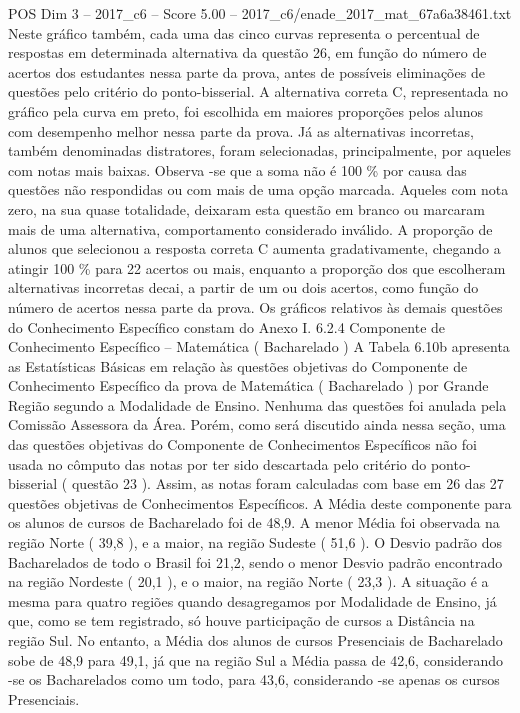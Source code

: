 \begin{textsample}{POS Dim 3 – 2017\_c6 – Score 5.00 – 2017\_c6/enade\_2017\_mat\_67a6a38461.txt}
Neste gráfico também, cada uma das cinco curvas representa o percentual de respostas em determinada alternativa da questão 26, em função do número de acertos dos estudantes nessa parte da prova, antes de possíveis eliminações de questões pelo critério do ponto-bisserial.
A alternativa correta C, representada no gráfico pela curva em preto, foi escolhida em maiores proporções pelos alunos com desempenho melhor nessa parte da prova.
Já as alternativas incorretas, também denominadas distratores, foram selecionadas, principalmente, por aqueles com notas mais baixas.
Observa -se que a soma não é 100 \% por causa das questões não respondidas ou com mais de uma opção marcada.
Aqueles com nota zero, na sua quase totalidade, deixaram esta questão em branco ou marcaram mais de uma alternativa, comportamento considerado inválido.
A proporção de alunos que selecionou a resposta correta C aumenta gradativamente, chegando a atingir 100 \% para 22 acertos ou mais, enquanto a proporção dos que escolheram alternativas incorretas decai, a partir de um ou dois acertos, como função do número de acertos nessa parte da prova.
Os gráficos relativos às demais questões do Conhecimento Específico constam do Anexo I. 6.2.4 Componente de Conhecimento Específico – Matemática ( Bacharelado ) A Tabela 6.10b apresenta as Estatísticas Básicas em relação às questões objetivas do Componente de Conhecimento Específico da prova de Matemática ( Bacharelado ) por Grande Região segundo a Modalidade de Ensino.
Nenhuma das questões foi anulada pela Comissão Assessora da Área.
Porém, como será discutido ainda nessa seção, uma das questões objetivas do Componente de Conhecimentos Específicos não foi usada no cômputo das notas por ter sido descartada pelo critério do ponto-bisserial ( questão 23 ).
Assim, as notas foram calculadas com base em 26 das 27 questões objetivas de Conhecimentos Específicos.
A Média deste componente para os alunos de cursos de Bacharelado foi de 48,9.
A menor Média foi observada na região Norte ( 39,8 ), e a maior, na região Sudeste ( 51,6 ).
O Desvio padrão dos Bacharelados de todo o Brasil foi 21,2, sendo o menor Desvio padrão encontrado na região Nordeste ( 20,1 ), e o maior, na região Norte ( 23,3 ).
A situação é a mesma para quatro regiões quando desagregamos por Modalidade de Ensino, já que, como se tem registrado, só houve participação de cursos a Distância na região Sul.
No entanto, a Média dos alunos de cursos Presenciais de Bacharelado sobe de 48,9 para 49,1, já que na região Sul a Média passa de 42,6, considerando -se os Bacharelados como um todo, para 43,6, considerando -se apenas os cursos Presenciais.

\end{textsample}
